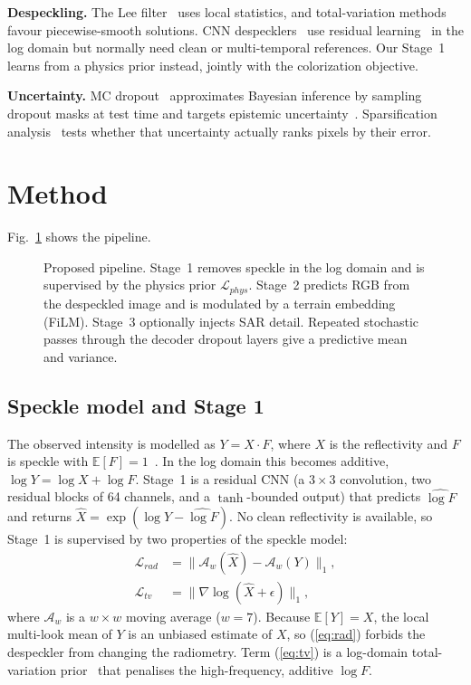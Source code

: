 \documentclass[conference]{IEEEtran}
\begin{document}
\textbf{Despeckling.} The Lee filter~\cite{lee1980filter} uses local statistics, and total-variation methods~\cite{rudin1992tv}
favour piecewise-smooth solutions. CNN despecklers~\cite{chierchia2017sarcnn} use residual learning~\cite{zhang2017dncnn} in the
log domain but normally need clean or multi-temporal references. Our Stage~1 learns from a physics prior instead, jointly with
the colorization objective.

\textbf{Uncertainty.} MC dropout~\cite{gal2016dropout} approximates Bayesian inference by sampling dropout masks at test time
and targets epistemic uncertainty~\cite{kendall2017uncertainty}. Sparsification analysis~\cite{ilg2018uncertainty} tests
whether that uncertainty actually ranks pixels by their error.

\section{Method}
Fig.~\ref{fig:arch} shows the pipeline.
\begin{figure}[t]
\centering

\caption{Proposed pipeline. Stage~1 removes speckle in the log domain and is supervised by the physics prior $\mathcal{L}_{phys}$.
Stage~2 predicts RGB from the despeckled image and is modulated by a terrain embedding (FiLM). Stage~3 optionally injects SAR
detail. Repeated stochastic passes through the decoder dropout layers give a predictive mean and variance.}
\label{fig:arch}
\end{figure}

\subsection{Speckle model and Stage 1}
The observed intensity is modelled as $Y = X\cdot F$, where $X$ is the reflectivity and $F$ is speckle with
$\mathbb{E}[F]=1$~\cite{goodman1976speckle}. In the log domain this becomes additive, $\log Y = \log X + \log F$. Stage~1 is a
residual CNN (a $3{\times}3$ convolution, two residual blocks of 64 channels, and a $\tanh$-bounded output) that predicts
$\widehat{\log F}$ and returns $\hat X = \exp(\log Y - \widehat{\log F})$. No clean reflectivity is available, so Stage~1 is
supervised by two properties of the speckle model:
\begin{align}
\mathcal{L}_{rad} &= \big\| \mathcal{A}_w(\hat X) - \mathcal{A}_w(Y) \big\|_1, \label{eq:rad}\\
\mathcal{L}_{tv}  &= \big\| \nabla \log(\hat X+\epsilon) \big\|_1, \label{eq:tv}
\end{align}
where $\mathcal{A}_w$ is a $w{\times}w$ moving average ($w{=}7$). Because $\mathbb{E}[Y]=X$, the local multi-look mean of $Y$
is an unbiased estimate of $X$, so (\ref{eq:rad}) forbids the despeckler from changing the radiometry. Term (\ref{eq:tv}) is a
log-domain total-variation prior~\cite{rudin1992tv} that penalises the high-frequency, additive $\log F$.
\end{document}
